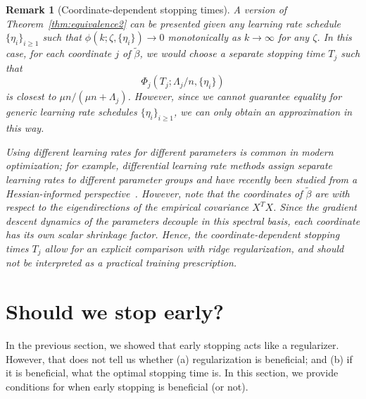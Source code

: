 \documentclass[11pt]{article}
\newtheorem{remark}{Remark}
\begin{document}
\begin{remark}[Coordinate-dependent stopping times]
A version of Theorem~\ref{thm:equivalence2} can be presented given any learning rate schedule $\{ \eta_i \}_{i \geq 1}$ such that $\phi(k; \zeta, \{ \eta_i \}) \to 0$ monotonically as $k \to \infty$ for any $\zeta$. In this case, for each coordinate $j$ of $\tilde{\beta}$, we would choose a separate stopping time $T_j$ such that
\[
    \Phi_j(T_j; \Lambda_j/n,\{\eta_i\})
\]
is closest to $\mu n/(\mu n + \Lambda_j)$. However, since we cannot guarantee equality for generic learning rate schedules $\{\eta_i\}_{i\geq 1}$, we can only obtain an approximation in this way.

Using different learning rates for different parameters is common in modern optimization; for example, differential learning rate methods assign separate learning rates to different parameter groups and have recently been studied from a Hessian-informed perspective~\cite{xu2025hessian}.
However, note that the coordinates of $\tilde{\beta}$ are with respect to the eigendirections of the empirical covariance $X^T X$. Since the gradient descent dynamics of the parameters decouple in this spectral basis, each coordinate has its own scalar shrinkage factor. Hence, the coordinate-dependent stopping times $T_j$ allow for an explicit comparison with ridge regularization, and should not be interpreted as a practical training prescription.
\end{remark}


\section{Should we stop early?} \label{sec:should-we-stop}

In the previous section, we showed that early stopping acts like a regularizer. However, that does not tell us whether (a) regularization is beneficial; and (b) if it is beneficial, what the optimal stopping time is. In this section, we provide conditions for when early stopping is beneficial (or not).
\end{document}
